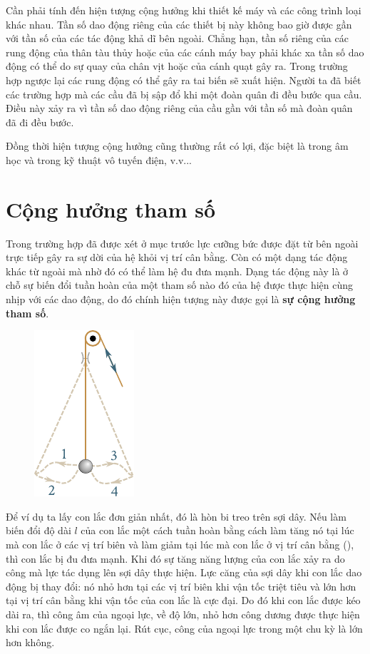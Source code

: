 Cần phải tính đến hiện tượng cộng hưởng khi thiết kế máy và các công trình loại khác nhau. Tần số dao động riêng của các thiết bị này không bao giờ được gần với tần số của các tác động khả dĩ bên ngoài. Chẳng hạn, tần số riêng của các rung động của thân tàu thủy hoặc của các cánh máy bay phải khác xa tần số dao động có thể do sự quay của chân vịt hoặc của cánh quạt gây ra. Trong trường hợp ngược lại các rung động có thể gây ra tai biến sẽ xuất hiện. Người ta đã biết các trường hợp mà các cầu đã bị sập đổ khi một đoàn quân đi đều bước qua cầu. Điều này xảy ra vì tần số dao động riêng của cầu gần với tần số mà đoàn quân đã đi đều bước.

Đồng thời hiện tượng cộng hưởng cũng thường rất có lợi, đặc biệt là trong âm học và trong kỹ thuật vô tuyến điện, v.v...

\section{Cộng hưởng tham số}\label{sec:7_13}

Trong trường hợp đã được xét ở mục trước lực cưỡng bức được đặt từ bên ngoài trực tiếp gây ra sự dời của hệ khỏi vị trí cân bằng. Còn có một dạng tác động khác từ ngoài mà nhờ đó có thể làm hệ đu đưa mạnh. Dạng tác động này là ở chỗ sự biến đổi tuần hoàn của một tham số nào đó của hệ được thực hiện cùng nhịp với các dao động, do đó chính hiện tượng này được gọi là \textbf{sự cộng hưởng tham số}.

\begin{figure}[!htb]
	\begin{center}
		\includegraphics[scale=0.95]{figures/ch_07/fig_7_26.pdf}
		\caption[]{}
		\label{fig:7_26}
	\end{center}
\end{figure}

Để ví dụ ta lấy con lắc đơn giản nhất, đó là hòn bi treo trên sợi dây. Nếu làm biến đổi độ dài $l$ của con lắc một cách tuần hoàn bằng cách làm tăng nó tại lúc mà con lắc ở các vị trí biên và làm giảm tại lúc mà con lắc ở vị trí cân bằng (), thì con lắc bị đu đưa mạnh. Khi đó sự tăng năng lượng của con lắc xảy ra do công mà lực tác dụng lên sợi dây thực hiện. Lực căng của sợi dây khi con lắc dao động bị thay đổi: nó nhỏ hơn tại các vị trí biên khi vận tốc triệt tiêu và lớn hơn tại vị trí cân bằng khi vận tốc của con lắc là cực đại. Do đó khi con lắc được kéo dài ra, thì công âm của ngoại lực, về độ lớn, nhỏ hơn công dương được thực hiện khi con lắc được co ngắn lại. Rút cục, công của ngoại lực trong một chu kỳ là lớn hơn không.
